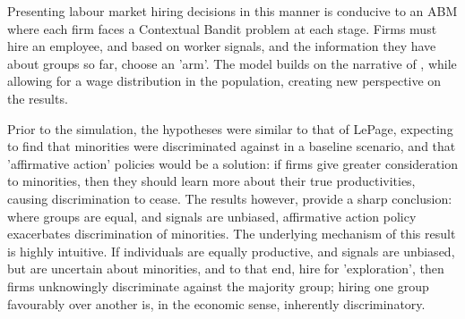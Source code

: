 \documentclass[]{article}
\begin{document}

Presenting labour market hiring decisions in this manner is conducive to an ABM where each firm faces a Contextual Bandit problem at each stage. Firms must hire an employee, and based on worker signals, and the information they have about groups so far, choose an 'arm'. The model builds on the narrative of \cite{Lepage2024}, while allowing for a wage distribution in the population, creating new perspective on the results.

Prior to the simulation, the hypotheses were similar to that of LePage, expecting to find that minorities were discriminated against in a baseline scenario, and that 'affirmative action' policies would be a solution: if firms give greater consideration to minorities, then they should learn more about their true productivities, causing discrimination to cease.
The results however, provide a sharp conclusion: where groups are equal, and signals are unbiased, affirmative action policy exacerbates discrimination of minorities.
The underlying mechanism of this result is highly intuitive. If individuals are equally productive, and signals are unbiased, but are uncertain about minorities, and to that end, hire for 'exploration', then firms unknowingly discriminate against the majority group; hiring one group favourably over another is, in the economic sense, inherently discriminatory.
\end{document}
